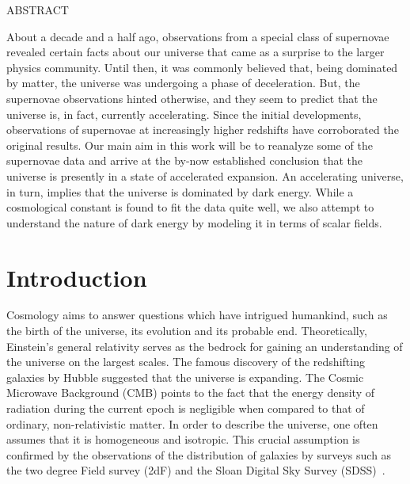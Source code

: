 \documentclass[12pt,a4paper,oneside]{book}
\begin{document}

\newpage\topskip 40pt
\thispagestyle{empty}
\centerline{\Large ABSTRACT}
\vskip 20pt\noindent 
About a decade and a half ago, observations from a special class of
supernovae revealed certain facts about our universe that came as a 
surprise to the larger physics community. 
Until then, it was commonly believed that, being dominated by matter,
the universe was undergoing a phase of deceleration. 
But, the supernovae observations hinted otherwise, and they seem to 
predict that the universe is, in fact, currently accelerating.
Since the initial developments, observations of supernovae at increasingly 
higher redshifts have corroborated the original results.
Our main aim in this work will be to reanalyze some of the supernovae data 
and arrive at the by-now established conclusion that the universe is presently 
in a state of accelerated expansion. 
An accelerating universe, in turn, implies that the universe is dominated 
by dark energy. 
While a cosmological constant is found to fit the data quite well, we also 
attempt to understand the nature of dark energy by modeling it in terms of
scalar fields. 


\newpage
\thispagestyle{empty}
\tableofcontents
\newpage




\chapter{Introduction}

Cosmology aims to answer questions which have intrigued humankind, such as 
the birth of the universe, its evolution and its probable end.
Theoretically, Einstein's general relativity serves as the bedrock for gaining
an understanding of the universe on the largest scales.
The famous discovery of the redshifting galaxies by Hubble suggested that the
universe is expanding.
The Cosmic Microwave Background (CMB) points to the fact that the energy
density 
of radiation during the current epoch is negligible when compared to that of 
ordinary, non-relativistic matter. 
In order to describe the universe, one often assumes that it is homogeneous and 
isotropic.
This crucial assumption is confirmed by the observations of the distribution 
of galaxies by surveys such as the two degree Field survey (2dF) and the Sloan 
Digital Sky Survey (SDSS)~\cite{2df,sdss}.
\end{document}
